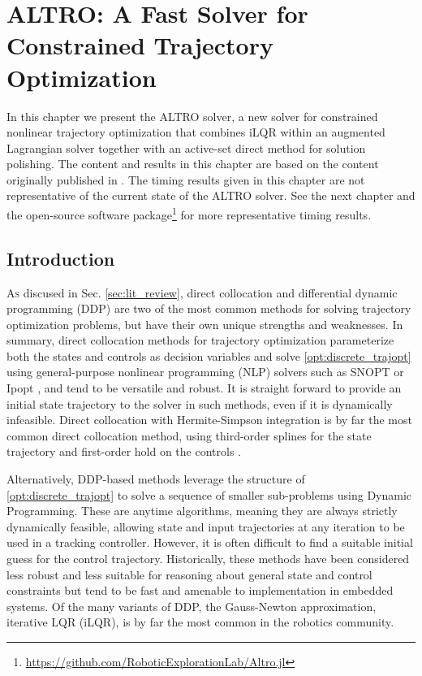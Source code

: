 \documentclass[../root.tex]{subfiles}
\begin{document}
\chapter[ALTRO]{ALTRO: A Fast Solver for Constrained Trajectory Optimization} \label{chap:altro}
In this chapter we present the ALTRO solver, a new solver for constrained 
nonlinear trajectory optimization that combines iLQR within an augmented 
Lagrangian solver together with an active-set direct method for solution 
polishing. The content and results in this chapter are based on the content
originally published in \cite{howell_ALTRO_2019}. The timing results given 
in this chapter are not representative of the current state of the ALTRO solver.
See the next chapter and the open-source software 
package\footnote{\url{https://github.com/RoboticExplorationLab/Altro.jl}} 
for more representative timing results.

\section{Introduction}

\lettrine{A}{s} discused in Sec. \ref{sec:lit_review}, direct collocation and
differential dynamic programming (DDP) are two of the most common methods for
solving trajectory optimization problems, but have their own unique strengths
and weaknesses. In summary, direct collocation methods for trajectory
optimization parameterize both the states and controls as decision variables
and solve \eqref{opt:discrete_trajopt} using general-purpose nonlinear
programming (NLP) solvers such as SNOPT \cite{gill_SNOPT_2005} or Ipopt
\cite{wachter_implementation_2006}, and tend to be versatile and robust. It
is straight forward to provide an initial state trajectory to the solver in
such methods, even if it is dynamically infeasible. Direct collocation with
Hermite-Simpson integration is by far the most common direct collocation
method, using third-order splines for the state trajectory and first-order
hold on the controls \cite{hargraves_Direct_1987}.

Alternatively, DDP-based methods leverage the structure of
\eqref{opt:discrete_trajopt} to solve a sequence of smaller sub-problems using
Dynamic Programming. These are anytime algorithms, meaning they are always
strictly dynamically feasible, allowing state and input trajectories at any
iteration to be used in a tracking controller. However, it is often difficult
to find a suitable initial guess for the control trajectory. Historically,
these methods have been considered less robust and less suitable for
reasoning about general state and control constraints but tend to be fast and
amenable to implementation in embedded systems. Of the many variants of DDP,
the Gauss-Newton approximation, iterative LQR (iLQR), is by far the most common
in the robotics community. 
\end{document}
